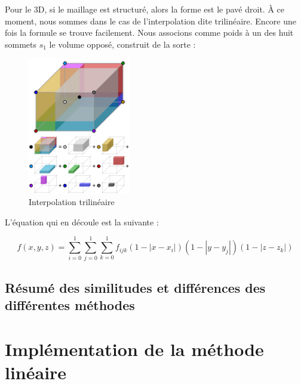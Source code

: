 Pour le 3D, si le maillage est structuré, alors la forme est le pavé droit. À ce moment, nous sommes dans le cas de l'interpolation dite trilinéaire. Encore une fois la formule se trouve facilement. Nous associons comme poids à un des huit sommets \( s_1 \) le volume opposé, construit de la sorte :

\begin{figure}[ht!]
    \centering
    \includegraphics[width=0.4\textwidth]{images/Trilinear_interpolation_visualisation.svg.png}
    \caption{Interpolation trilinéaire} %
\end{figure}

L'équation qui en découle est la suivante :

\begin{equation}
    f(x, y, z) = \sum_{i=0}^{1} \sum_{j=0}^{1} \sum_{k=0}^{1} f_{ijk} (1 - |x - x_i|)(1 - |y - y_j|)(1 - |z - z_k|)
\end{equation}



\subsection{Résumé des similitudes et différences des différentes méthodes}



\section{Implémentation de la méthode linéaire}

